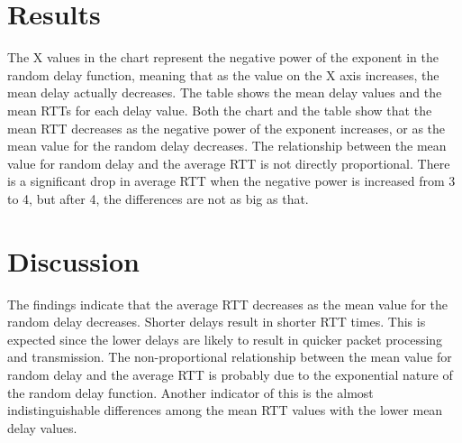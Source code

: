 \documentclass[10pt,a4paper, margin=1in]{article}
\begin{document}
\section*{Results}

The X values in the chart represent the negative power of the exponent in the random delay function,
meaning that as the value on the X axis increases, the mean delay actually decreases.
The table shows the mean delay values and the mean RTTs for each delay value.
Both the chart and the table show that the mean RTT decreases as the negative power of the exponent increases, or as the mean value for the random delay decreases.
The relationship between the mean value for random delay and the average RTT is not directly proportional.
There is a significant drop in average RTT when the negative power is increased from 3 to 4, but after 4, the differences are not as big as that.


\section*{Discussion}
The findings indicate that the average RTT decreases as the mean value for the random delay decreases.
Shorter delays result in shorter RTT times.
This is expected since the lower delays are likely to result in quicker packet processing and transmission.
The non-proportional relationship between the mean value for random delay and the average RTT is probably due to the exponential nature of the random delay function.
Another indicator of this is the almost indistinguishable differences among the mean RTT values with the lower mean delay values.

 
\end{document}
